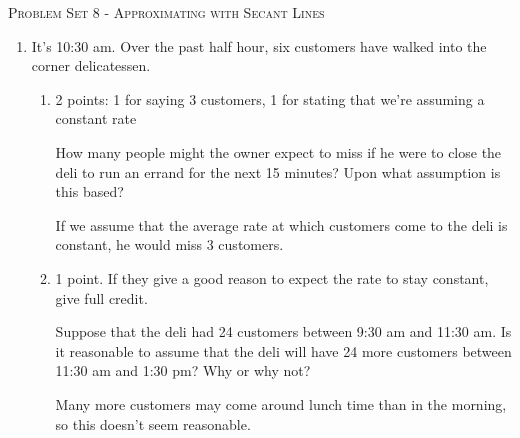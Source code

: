 \documentclass{article}
\begin{document}
\begin{center}
  \large\textsc{Problem Set 8 - Approximating with Secant Lines}
\end{center}


\begin{enumerate}
\item %

  It's 10:30 am. Over the past half hour, six customers have walked into the corner delicatessen.

  \begin{enumerate} 

  \item

    \begin{grading}
      2 points: 1 for saying 3 customers, 1 for stating that we're assuming a constant rate
    \end{grading}

    \begin{problem}[\vfill]
      How many people might the owner expect to miss if he were to close the deli to run an errand for the next 15 minutes? Upon what assumption is this based?
    \end{problem}

    \begin{solution} 
      If we assume that the average rate at which customers come to the deli is constant, he would miss $3$ customers.
    \end{solution} 

  \item

    \begin{grading}
      1 point. If they give a good reason to expect the rate to stay constant, give full credit. 
    \end{grading}

    \begin{problem}[\vfill]
      Suppose that the deli had 24 customers between 9:30 am and 11:30 am. Is it reasonable to assume that the deli will have 24 more customers between 11:30 am and 1:30 pm? Why or why not?
    \end{problem}

    \begin{solution}
      Many more customers may come around lunch time than in the morning, so this doesn't seem reasonable.
    \end{solution}


\end{enumerate}
\end{enumerate}
\end{document}
